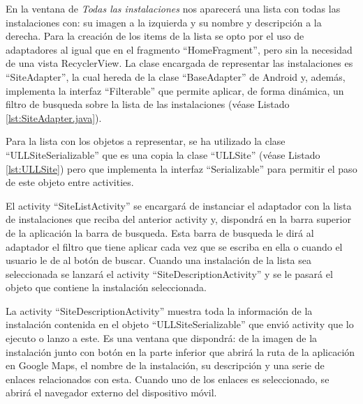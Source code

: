 En la ventana de \textit{Todas las instalaciones} nos aparecerá una lista con todas las instalaciones con: su imagen a la izquierda y su nombre y descripción a la derecha. Para la creación de los items de la lista se opto por el uso de adaptadores al igual que en el fragmento ``HomeFragment'', pero sin la necesidad de una vista RecyclerView. La clase encargada de representar las instalaciones es ``SiteAdapter'', la cual hereda de la clase ``BaseAdapter'' de Android y, además, implementa la interfaz ``Filterable'' que permite aplicar, de forma dinámica, un filtro de busqueda sobre la lista de las instalaciones (véase Listado \ref{lst:SiteAdapter.java}). 





Para la lista con los objetos a representar, se ha utilizado la clase ``ULLSiteSerializable'' que es una copia la clase  ``ULLSite'' (véase Listado \ref{lst:ULLSite}) pero que implementa la interfaz ``Serializable'' para permitir el paso de este objeto entre activities. 

El activity ``SiteListActivity'' se encargará de instanciar el adaptador con la lista de instalaciones que reciba del anterior activity y, dispondrá en la barra superior de la aplicación la barra de busqueda. Esta barra de busqueda le dirá al adaptador el filtro que tiene aplicar cada vez que se escriba en ella o cuando el usuario le de al botón de buscar. Cuando una instalación de la lista sea seleccionada se lanzará el activity ``SiteDescriptionActivity'' y se le pasará el objeto que contiene la instalación seleccionada.


    

La activity ``SiteDescriptionActivity'' muestra toda la información de la instalación contenida en el objeto ``ULLSiteSerializable'' que envió activity que lo ejecuto o lanzo a este. Es una ventana que dispondrá: de la imagen de la instalación junto con botón en la parte inferior que abrirá la ruta de la aplicación en Google Maps, el nombre de la instalación, su descripción y una serie de enlaces relacionados con esta. Cuando uno de los enlaces es seleccionado, se abrirá el navegador externo del dispositivo móvil.

 

 
